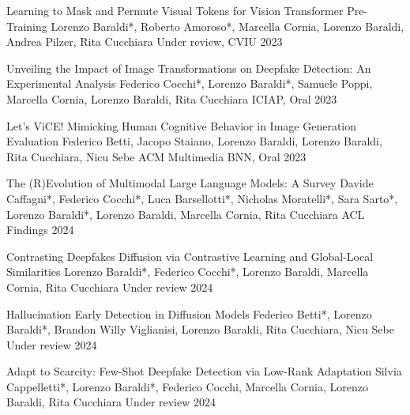 

\begin{cvpubblications}
    \cvpubblication
    {Learning to Mask and Permute Visual Tokens for Vision Transformer Pre-Training} %
    {Lorenzo Baraldi*, Roberto Amoroso*, Marcella Cornia, Lorenzo Baraldi, Andrea Pilzer, Rita Cucchiara} %
    {Under review, CVIU} %
    {2023} %

    \cvpubblication
    {Unveiling the Impact of Image Transformations on Deepfake Detection: An Experimental Analysis} %
    {Federico Cocchi*, Lorenzo Baraldi*, Samuele Poppi, Marcella Cornia, Lorenzo Baraldi, Rita Cucchiara} %
    {ICIAP, Oral} %
    {2023} %

    \cvpubblication
    {Let’s ViCE! Mimicking Human Cognitive Behavior in Image Generation Evaluation} %
    {Federico Betti, Jacopo Staiano, Lorenzo Baraldi, Lorenzo Baraldi, Rita Cucchiara, Nicu Sebe} %
    {ACM Multimedia BNN, Oral} %
    {2023} %

    \cvpubblication
    {The (R)Evolution of Multimodal Large Language Models: A Survey} %
    {Davide Caffagni*, Federico Cocchi*, Luca Barsellotti*, Nicholas Moratelli*, Sara Sarto*, Lorenzo Baraldi*, Lorenzo Baraldi, Marcella Cornia, Rita Cucchiara} %
    {ACL Findings} %
    {2024} %

    \cvpubblication
    {Contrasting Deepfakes Diffusion via Contrastive Learning and Global-Local Similarities} %
    {Lorenzo Baraldi*, Federico Cocchi*, Lorenzo Baraldi, Marcella Cornia, Rita Cucchiara} %
    {Under review} %
    {2024} %
    
    \cvpubblication
    {Hallucination Early Detection in Diffusion Models} %
    {Federico Betti*, Lorenzo Baraldi*, Brandon Willy Viglianisi,  Lorenzo Baraldi, Rita Cucchiara, Nicu Sebe} %
    {Under review} %
    {2024} %

    \cvpubblication
    {Adapt to Scarcity: Few-Shot Deepfake Detection via Low-Rank Adaptation} %
    {Silvia Cappelletti*, Lorenzo Baraldi*, Federico Cocchi,  Marcella Cornia, Lorenzo Baraldi, Rita Cucchiara} %
    {Under review} %
    {2024} %
    
\end{cvpubblications}

